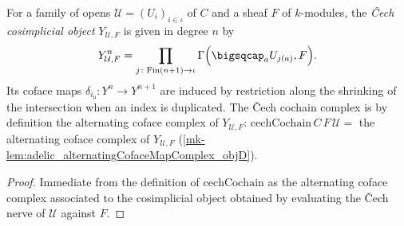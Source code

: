 \begin{definition}
  \label{mk-def:adelic_cechCosimplicial}
  \leanok
  For a family of opens \(\mathcal{U} = (U_i)_{i \in \iota}\) of \(C\)
  and a sheaf \(F\) of \(k\)-modules, the \emph{Čech cosimplicial object}
  \(Y_{\mathcal{U}, F}\) is given in degree \(n\) by
  \[
    Y_{\mathcal U,F}^n=
      \prod_{j \colon \mathrm{Fin}(n+1) \to \iota}
        \Gamma\Bigl(\bigsqcap_a U_{j(a)},F\Bigr).
  \]
  Its coface maps \(\delta_{i_0} \colon Y^n \to Y^{n+1}\) are induced by
  restriction along the shrinking of the
  intersection when an index is duplicated. The Čech cochain complex is
  by definition the alternating coface complex of \(Y_{\mathcal{U},
  F}\):
  \(\mathrm{cechCochain}\, C\, F\, \mathcal{U} =\) the alternating coface
  complex of \(Y_{\mathcal{U}, F}\)
  (\ref{mk-lem:adelic_alternatingCofaceMapComplex_objD}).
\end{definition}
\begin{proof}
  \leanok
  Immediate from the definition of \(\mathrm{cechCochain}\) as the
  alternating coface complex associated to the cosimplicial object
  obtained by evaluating the Čech nerve of \(\mathcal{U}\) against \(F\).
\end{proof}

